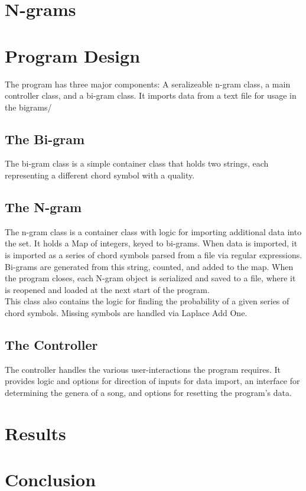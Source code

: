 \documentclass{article}
\begin{document}
\newpage

\section{N-grams}

\newpage

\section{Program Design}
The program has three major components:  A seralizeable n-gram class, a main controller class, and a bi-gram class.  It imports data from a text file for usage in the bigrams/
\subsection{The Bi-gram}
The bi-gram class is a simple container class that holds two strings, each representing a different chord symbol with a quality.
\subsection{The N-gram}
The n-gram class is a container class with logic for importing additional data into the set.  It holds a Map of integers, keyed to bi-grams.  When data is imported, it is imported as a series of chord symbols parsed from a file via regular expressions.  Bi-grams are generated from this string, counted, and added to the map.  When the program closes, each N-gram object is serialized and saved to a file, where it is reopened and loaded at the next start of the program.\\
This class also contains the logic for finding the probability of a given series of chord symbols.  Missing symbols are handled via Laplace Add One.
\subsection{The Controller}
The controller handles the various user-interactions the program requires.  It provides logic and options for direction of inputs for data import, an interface for determining the genera of a song, and options for resetting the program's data.

\newpage

\section{Results}

\newpage

\section{Conclusion}
\end{document}
